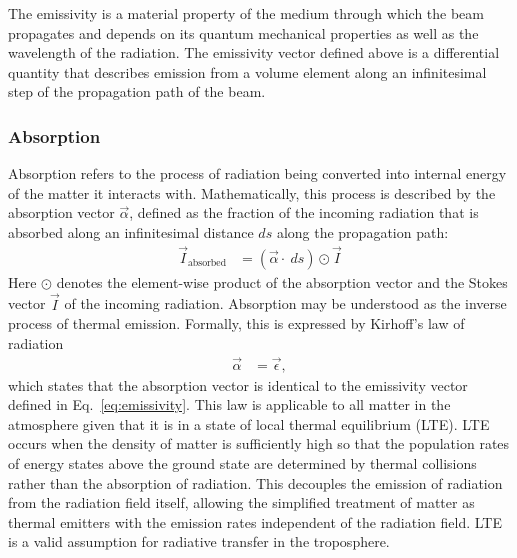  The emissivity is a material property of the medium through which the beam
 propagates and depends on its quantum mechanical properties as well as the
 wavelength of the radiation. The emissivity vector defined above is a
 differential quantity that describes emission from a volume element along an
 infinitesimal step of the propagation path of the beam.



\subsubsection{Absorption}

Absorption refers to the process of radiation being converted into internal
energy of the matter it interacts with. Mathematically, this process is
described by the absorption vector $\vec{\alpha}$, defined as the fraction of
the incoming radiation that is absorbed along an infinitesimal distance $ds$
along the propagation path:
\begin{align}
\vec{I}_\text{absorbed} &= (\vec{\alpha} \cdot\ ds) \odot \vec{I}
\end{align}
Here $\odot$ denotes the element-wise product of the absorption vector and
the Stokes vector $\vec{I}$ of the incoming radiation. Absorption may be
understood as the inverse process of thermal emission. Formally, this is
expressed by Kirhoff's  law of radiation
\begin{align}
  \vec{\alpha} &= \vec{\epsilon},
\end{align}
which states that the absorption vector is identical to the emissivity vector
defined in Eq.~\ref{eq:emissivity}. This law is applicable to all matter in the
atmosphere given that it is in a state of local thermal equilibrium (LTE). LTE
occurs when the density of matter is sufficiently high so that the population
rates of energy states above the ground state are determined by thermal
collisions rather than the absorption of radiation. This decouples the emission
of radiation from the radiation field itself, allowing the simplified treatment
of matter as thermal emitters with the emission rates independent of the
radiation field. LTE is a valid assumption for radiative transfer in the
troposphere.

